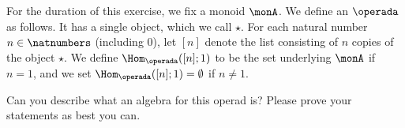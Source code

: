 \begin{gradedexercise}\label{ex:MonoidsActionsAsAlgebras}
For the duration of this exercise, we fix a monoid $\monA$. 
We define an $\operada$ as follows. It has a single object, which we call $\star$.  For each natural number $n \in \natnumbers$ (including $0$), let $[n]$ denote the list consisting of $n$ copies of the object $\star$. We define $\Hom_\operada([n];1)$ to be the set underlying $\monA$ if $n =1$, and we set $\Hom_\operada([n];1) = \emptyset$ if $n \neq 1$. 

Can you describe what an algebra for this operad is?  Please prove your statements as best you can. 
\end{gradedexercise}










\devel{

\begin{forslides}
  \begin{equation*}
\label{eq:composition_operad}
    [\mora,\morb]\mthen \morc
\end{equation*}
\end{forslides}

}

